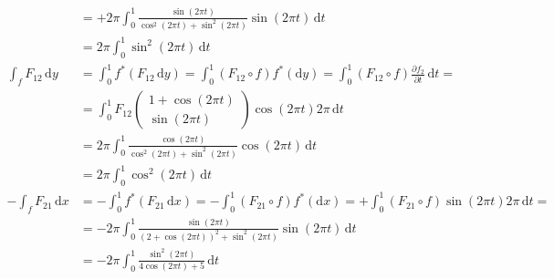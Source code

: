 \documentclass[12pt,a4paper]{article}
\begin{document}
\begin{align}
			&= + 2 \pi \int_0^1 \frac{\sin(2\pi t)}{\cos^2(2\pi t) + \sin^2(2\pi t)} \sin (2\pi t) \,\mathrm{d}t \\
			&= 2 \pi \int_0^1 \sin^2 (2\pi t) \,\mathrm{d}t \\
			\int_f F_{12} \,\mathrm{d}y &= \int_0^1 f^*(F_{12} \,\mathrm{d}y) = \int_0^1 (F_{12} \circ f) f^*(\mathrm{d}y) = \int_0^1 (F_{12} \circ f) \frac{\partial f_2}{\partial t}\,\mathrm{d}t = \\
			&= \int_0^1 F_{12} \begin{pmatrix} 1 + \cos(2\pi t) \\ \sin(2\pi t) \end{pmatrix} \cos (2\pi t) 2\pi \,\mathrm{d}t \\
			&= 2\pi \int_0^1 \frac{\cos(2\pi t)}{\cos^2(2\pi t) + \sin^2(2\pi t)} \cos (2\pi t) \,\mathrm{d}t \\
			&= 2 \pi \int_0^1 \cos^2 (2\pi t) \,\mathrm{d}t \\
			- \int_f F_{21} \,\mathrm{d}x &= - \int_0^1 f^*(F_{21} \,\mathrm{d}x) = - \int_0^1 (F_{21} \circ f) f^*(\mathrm{d}x) = + \int_0^1 (F_{21} \circ f) \sin (2\pi t) 2\pi \,\mathrm{d}t = \\
			&= - 2\pi \int_0^1 \frac{\sin(2\pi t)}{(2 + \cos(2\pi t))^2 + \sin^2(2\pi t)} \sin (2 \pi t) \,\mathrm{d}t \\
			&= - 2\pi \int_0^1 \frac{\sin^2(2\pi t)}{4 \cos(2\pi t) + 5} \,\mathrm{d}t
		\end{align}
\end{document}
